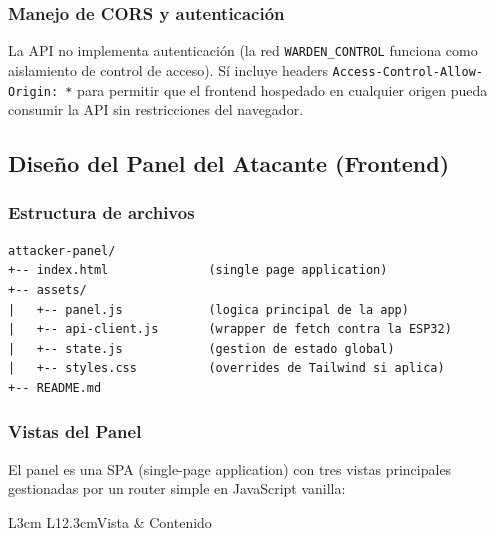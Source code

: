\documentclass[11pt,a4paper]{article}
\begin{document}
\subsubsection{Manejo de CORS y autenticación}

La API no implementa autenticación (la red \texttt{WARDEN\_CONTROL}
funciona como aislamiento de control de acceso). Sí incluye headers
\texttt{Access-Control-Allow-Origin: *} para permitir que el frontend
hospedado en cualquier origen pueda consumir la API sin restricciones
del navegador.

\subsection{Diseño del Panel del Atacante (Frontend)}

\subsubsection{Estructura de archivos}

\begin{lstlisting}
attacker-panel/
+-- index.html              (single page application)
+-- assets/
|   +-- panel.js            (logica principal de la app)
|   +-- api-client.js       (wrapper de fetch contra la ESP32)
|   +-- state.js            (gestion de estado global)
|   +-- styles.css          (overrides de Tailwind si aplica)
+-- README.md
\end{lstlisting}

\subsubsection{Vistas del Panel}

El panel es una SPA (single-page application) con tres vistas
principales gestionadas por un router simple en JavaScript vanilla:

\begin{datatable}{L{3cm} L{12.3cm}}{Vista & Contenido}
\end{datatable}
\end{document}
